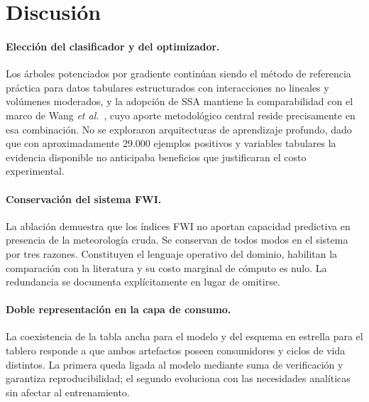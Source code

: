 \documentclass[11pt,a4paper]{article}
\begin{document}
\FloatBarrier

\section{Discusión}
\label{sec:discusion}

\paragraph{Elección del clasificador y del optimizador.}
Los árboles potenciados por gradiente continúan siendo el método de
referencia práctica para datos tabulares estructurados con interacciones no
lineales y volúmenes moderados, y la adopción de SSA mantiene la
comparabilidad con el marco de Wang \emph{et al.}~\cite{wang2026}, cuyo
aporte metodológico central reside precisamente en esa combinación. No se
exploraron arquitecturas de aprendizaje profundo, dado que con
aproximadamente 29.000 ejemplos positivos y variables tabulares la
evidencia disponible no anticipaba beneficios que justificaran el costo
experimental.

\paragraph{Conservación del sistema FWI.}
La ablación demuestra que los índices FWI no aportan capacidad predictiva
en presencia de la meteorología cruda. Se conservan de todos modos en el
sistema por tres razones. Constituyen el lenguaje operativo del dominio,
habilitan la comparación con la literatura y su costo marginal de cómputo
es nulo. La redundancia se documenta explícitamente en lugar de omitirse.

\paragraph{Doble representación en la capa de consumo.}
La coexistencia de la tabla ancha para el modelo y del esquema en estrella
para el tablero responde a que ambos artefactos poseen consumidores y
ciclos de vida distintos. La primera queda ligada al modelo mediante suma
de verificación y garantiza reproducibilidad; el segundo evoluciona con las
necesidades analíticas sin afectar al entrenamiento.
\end{document}
